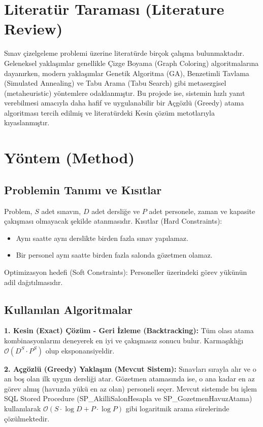 \documentclass[conference]{IEEEtran}
\begin{document}
\section{Literatür Taraması (Literature Review)}
Sınav çizelgeleme problemi üzerine literatürde birçok çalışma bulunmaktadır. Geleneksel yaklaşımlar genellikle Çizge Boyama (Graph Coloring) algoritmalarına dayanırken, modern yaklaşımlar Genetik Algoritma (GA), Benzetimli Tavlama (Simulated Annealing) ve Tabu Arama (Tabu Search) gibi metasezgisel (metaheuristic) yöntemlere odaklanmıştır. Bu projede ise, sistemin hızlı yanıt verebilmesi amacıyla daha hafif ve uygulanabilir bir Açgözlü (Greedy) atama algoritması tercih edilmiş ve literatürdeki Kesin çözüm metotlarıyla kıyaslanmıştır.

\section{Yöntem (Method)}
\subsection{Problemin Tanımı ve Kısıtlar}
Problem, $S$ adet sınavın, $D$ adet dersliğe ve $P$ adet personele, zaman ve kapasite çakışması olmayacak şekilde atanmasıdır. Kısıtlar (Hard Constraints):
\begin{itemize}
    \item Aynı saatte aynı derslikte birden fazla sınav yapılamaz.
    \item Bir personel aynı saatte birden fazla salonda gözetmen olamaz.
\end{itemize}
Optimizasyon hedefi (Soft Constraints): Personeller üzerindeki görev yükünün adil dağıtılmasıdır.

\subsection{Kullanılan Algoritmalar}
\textbf{1. Kesin (Exact) Çözüm - Geri İzleme (Backtracking):} Tüm olası atama kombinasyonlarını deneyerek en iyi ve çakışmasız sonucu bulur. Karmaşıklığı $\mathcal{O}(D^S \cdot P^S)$ olup eksponansiyeldir.

\textbf{2. Açgözlü (Greedy) Yaklaşım (Mevcut Sistem):} Sınavları sırayla alır ve o an boş olan ilk uygun dersliği atar. Gözetmen atamasında ise, o ana kadar en az görev almış (havuzda yükü en az olan) personeli seçer. Mevcut sistemde bu işlem SQL Stored Procedure (SP\_AkilliSalonHesapla ve SP\_GozetmenHavuzAtama) kullanılarak $\mathcal{O}(S \cdot \log D + P \cdot \log P)$ gibi logaritmik arama sürelerinde çözülmektedir.
\end{document}
